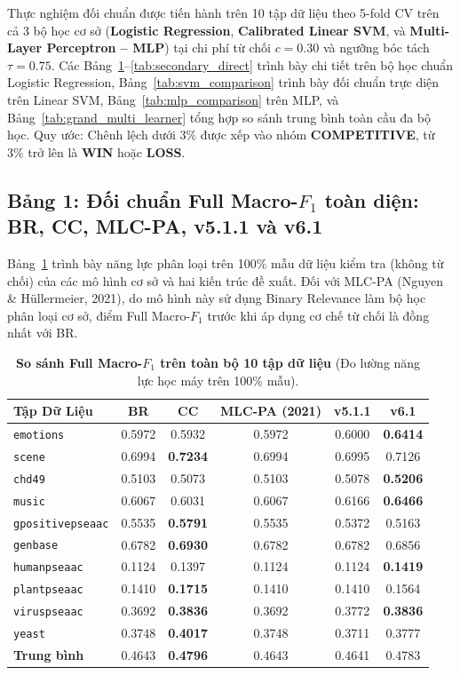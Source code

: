 \documentclass[11pt,a4paper]{article}
\begin{document}
Thực nghiệm đối chuẩn được tiến hành trên 10 tập dữ liệu theo 5-fold CV trên cả 3 bộ học cơ sở (\textbf{Logistic Regression}, \textbf{Calibrated Linear SVM}, và \textbf{Multi-Layer Perceptron -- MLP}) tại chi phí từ chối $c = 0.30$ và ngưỡng bóc tách $\tau = 0.75$. Các Bảng~\ref{tab:full_f1_multimodel}--\ref{tab:secondary_direct} trình bày chi tiết trên bộ học chuẩn Logistic Regression, Bảng~\ref{tab:svm_comparison} trình bày đối chuẩn trực diện trên Linear SVM, Bảng~\ref{tab:mlp_comparison} trên MLP, và Bảng~\ref{tab:grand_multi_learner} tổng hợp so sánh trung bình toàn cầu đa bộ học. Quy ước: Chênh lệch dưới 3\% được xếp vào nhóm \textbf{COMPETITIVE}, từ 3\% trở lên là \textbf{WIN} hoặc \textbf{LOSS}.

\subsection{Bảng 1: Đối chuẩn Full Macro-\texorpdfstring{$F_1$}{F1} toàn diện: BR, CC, MLC-PA, v5.1.1 và v6.1}
Bảng~\ref{tab:full_f1_multimodel} trình bày năng lực phân loại trên 100\% mẫu dữ liệu kiểm tra (không từ chối) của các mô hình cơ sở và hai kiến trúc đề xuất. Đối với MLC-PA (Nguyen \& Hüllermeier, 2021), do mô hình này sử dụng Binary Relevance làm bộ học phân loại cơ sở, điểm Full Macro-$F_1$ trước khi áp dụng cơ chế từ chối là đồng nhất với BR.

\begin{table}[H]
\centering
\small
\setlength{\tabcolsep}{6pt}
\caption{\textbf{So sánh Full Macro-$F_1$ trên toàn bộ 10 tập dữ liệu} (Đo lường năng lực học máy trên 100\% mẫu).}
\label{tab:full_f1_multimodel}
\begin{tabular}{lccccc}
\toprule
\textbf{Tập Dữ Liệu} & \textbf{BR} & \textbf{CC} & \textbf{MLC-PA (2021)} & \textbf{v5.1.1} & \textbf{v6.1} \\
\midrule
\texttt{emotions} & 0.5972 & 0.5932 & 0.5972 & 0.6000 & \textbf{0.6414} \\
\texttt{scene} & 0.6994 & \textbf{0.7234} & 0.6994 & 0.6995 & 0.7126 \\
\texttt{chd49} & 0.5103 & 0.5073 & 0.5103 & 0.5078 & \textbf{0.5206} \\
\texttt{music} & 0.6067 & 0.6031 & 0.6067 & 0.6166 & \textbf{0.6466} \\
\texttt{gpositivepseaac} & 0.5535 & \textbf{0.5791} & 0.5535 & 0.5372 & 0.5163 \\
\texttt{genbase} & 0.6782 & \textbf{0.6930} & 0.6782 & 0.6782 & 0.6856 \\
\texttt{humanpseaac} & 0.1124 & 0.1397 & 0.1124 & 0.1124 & \textbf{0.1419} \\
\texttt{plantpseaac} & 0.1410 & \textbf{0.1715} & 0.1410 & 0.1410 & 0.1564 \\
\texttt{viruspseaac} & 0.3692 & \textbf{0.3836} & 0.3692 & 0.3772 & \textbf{0.3836} \\
\texttt{yeast} & 0.3748 & \textbf{0.4017} & 0.3748 & 0.3711 & 0.3777 \\
\midrule
\textbf{Trung bình} & 0.4643 & \textbf{0.4796} & 0.4643 & 0.4641 & 0.4783 \\
\bottomrule
\end{tabular}
\end{table}
\end{document}
